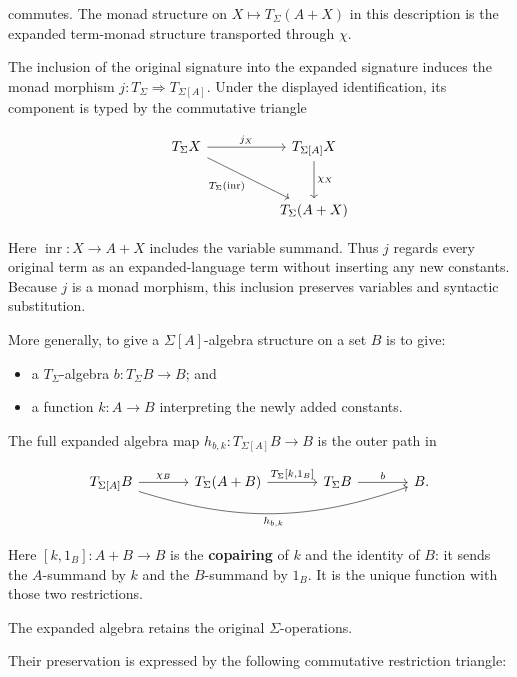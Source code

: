 \documentclass[11pt]{article}
\newcommand{\tightlist}{\setlength{\itemsep}{0pt}%
  \setlength{\parskip}{0pt}}
\theoremstyle{definition}
\begin{document}
commutes. The monad structure on \(X\mapsto T_\Sigma(A+X)\) in this
description is the expanded term-monad structure transported through
\(\chi\).

The inclusion of the original signature into the expanded signature induces
the monad morphism \(j:T_\Sigma\Rightarrow T_{\Sigma[A]}\). Under the
displayed identification, its component is typed by the commutative triangle

\[
\begin{tikzcd}[row sep=large,column sep=huge]
T_\Sigma X \arrow[r,"j_X"]
  \arrow[dr,"T_\Sigma(\operatorname{inr})"'] &
T_{\Sigma[A]}X \arrow[d,"\chi_X"] \\
& T_\Sigma(A+X)
\end{tikzcd}
\]

Here \(\operatorname{inr}:X\to A+X\) includes the variable summand.
Thus \(j\) regards every original term as an expanded-language term
without inserting any new constants. Because \(j\) is a monad morphism,
this inclusion preserves variables and syntactic substitution.

More generally, to give a \(\Sigma[A]\)-algebra structure on a set \(B\)
is to give:

\begin{itemize}
\tightlist
\item
  a \(T_\Sigma\)-algebra \(b:T_\Sigma B\to B\); and
\item
  a function \(k:A\to B\) interpreting the newly added constants.
\end{itemize}

The full expanded algebra map \(h_{b,k}:T_{\Sigma[A]}B\to B\) is the outer
path in

\[
\begin{tikzcd}[column sep=large]
T_{\Sigma[A]}B \arrow[r,"\chi_B"]
  \arrow[rrr,bend right=18,"{h_{b,k}}"'] &
T_\Sigma(A+B) \arrow[r,"{T_\Sigma[k,1_B]}"] &
T_\Sigma B \arrow[r,"b"] & B.
\end{tikzcd}
\]

Here \([k,1_B]:A+B\to B\) is the \textbf{copairing} of \(k\) and the
identity of \(B\): it sends the \(A\)-summand by \(k\) and the
\(B\)-summand by \(1_B\). It is the unique function with those two
restrictions.

The expanded algebra retains the original \(\Sigma\)-operations.

Their preservation is expressed by the following commutative restriction
triangle:
\end{document}
